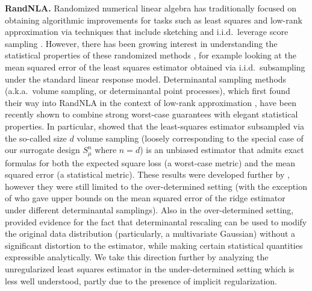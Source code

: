 \documentclass[11pt]{article}
\begin{document}
\textbf{RandNLA.}
Randomized numerical linear algebra
\cite{Mah-mat-rev_JRNL,DM16_CACM,RandNLA_PCMIchapter_TR} has
traditionally focused on obtaining algorithmic improvements for tasks
such as least squares and low-rank approximation via techniques that include
sketching \cite{sarlos-sketching} and i.i.d.~leverage score sampling
\cite{Drineas2006sampling}. However, there has been growing
interest in understanding the statistical properties of these
randomized methods \cite{MMY15,GarveshMahoney_JMLR}, for example
looking at the mean squared error of the least squares estimator
obtained via i.i.d.~subsampling under the standard linear response
model. Determinantal sampling methods (a.k.a.~volume sampling, or
determinantal point processes), which first found their way
into RandNLA in the context of low-rank approximation
\cite{pca-volume-sampling}, have been recently shown to combine
strong worst-case guarantees with elegant statistical properties.
In particular, \cite{unbiased-estimates} showed that the
least-squares estimator subsampled via the so-called size $d$ volume
sampling (loosely corresponding to the special case of our surrogate design
$S_\mu^n$ where $n=d$) is an unbiased estimator that admits exact
formulas for both the expected square loss (a worst-case metric)
and the mean squared error (a statistical metric). These results were
developed further by
\cite{leveraged-volume-sampling,correcting-bias,minimax-experimental-design},
however they were still limited to the over-determined setting (with
the exception of
\cite{regularized-volume-sampling,bayesian-experimental-design} who
gave upper bounds on the mean squared error of the ridge estimator
under different determinantal samplings). Also in the over-determined setting,
\cite{correcting-bias-journal} provided evidence for the fact that
determinantal rescaling can be used to modify the original data
distribution (particularly, a multivariate Gaussian) without a
significant distortion to the estimator, while making certain
statistical quantities expressible analytically. We take this
direction further by analyzing the unregularized least squares
estimator in the under-determined setting which is less well
understood, partly due to the presence of implicit regularization.
\end{document}
